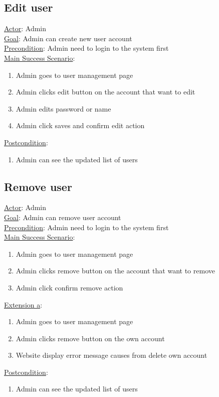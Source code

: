 \documentclass[12pt,oneside,openright,a4paper]{cpe-english-project}
\begin{document}
\subsection{Edit user}
\underline{Actor}: Admin\\
\underline{Goal}: Admin can create new user account\\
\underline{Precondition}: Admin need to login to the system first\\
\underline{Main Success Scenario}:
\begin{enumerate}[label={\arabic*.}]
	\item Admin goes to user management page
	\item Admin clicks edit button on the account that want to edit
	\item Admin edits password or name
	\item Admin click saves and confirm edit action
\end{enumerate}
\underline{Postcondition}: 
\begin{enumerate}[label={\arabic*.}]
	\item Admin can see the updated list of users
\end{enumerate}

\subsection{Remove user}
\underline{Actor}: Admin\\
\underline{Goal}: Admin can remove user account\\
\underline{Precondition}: Admin need to login to the system first\\
\underline{Main Success Scenario}:
\begin{enumerate}[label={\arabic*.}]
	\item Admin goes to user management page
	\item Admin clicks remove button on the account that want to remove
	\item Admin click confirm remove action
\end{enumerate}
\underline{Extension a}:
\begin{enumerate}[label={\arabic*.}]
	\item Admin goes to user management page
	\item Admin clicks remove button on the own account
	\item Website display error message causes from delete own account
\end{enumerate}
\underline{Postcondition}: 
\begin{enumerate}[label={\arabic*.}]
	\item Admin can see the updated list of users
\end{enumerate}
\end{document}
